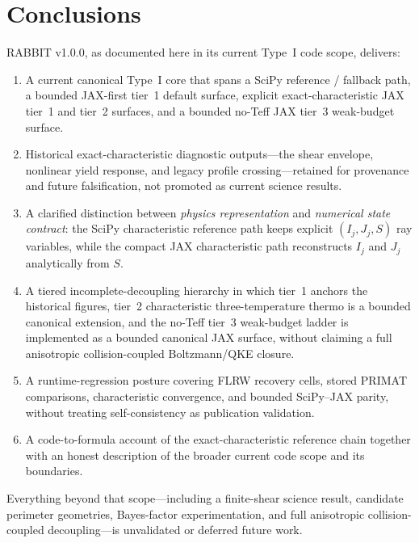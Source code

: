 \section{Conclusions}\label{sec:conclusions}

RABBIT v1.0.0, as documented here in its current Type~I code scope, delivers:

\begin{enumerate}
\item A current canonical Type~I core that spans a SciPy reference / fallback path, a bounded JAX-first tier~1 default surface, explicit exact-characteristic JAX tier~1 and tier~2 surfaces, and a bounded no-Teff JAX tier~3 weak-budget surface.

\item Historical exact-characteristic diagnostic outputs---the shear envelope, nonlinear yield response, and legacy profile crossing---retained for provenance and future falsification, not promoted as current science results.

\item A clarified distinction between \emph{physics representation} and \emph{numerical state contract}: the SciPy characteristic reference path keeps explicit $(I_j,J_j,S)$ ray variables, while the compact JAX characteristic path reconstructs $I_j$ and $J_j$ analytically from $S$.

\item A tiered incomplete-decoupling hierarchy in which tier~1 anchors the historical figures, tier~2 characteristic three-temperature thermo is a bounded canonical extension, and the no-Teff tier~3 weak-budget ladder is implemented as a bounded canonical JAX surface, without claiming a full anisotropic collision-coupled Boltzmann/QKE closure.

\item A runtime-regression posture covering FLRW recovery cells, stored PRIMAT comparisons, characteristic convergence, and bounded SciPy--JAX parity, without treating self-consistency as publication validation.

\item A code-to-formula account of the exact-characteristic reference chain together with an honest description of the broader current code scope and its boundaries.
\end{enumerate}

Everything beyond that scope---including a finite-shear science result, candidate perimeter geometries, Bayes-factor experimentation, and full anisotropic collision-coupled decoupling---is unvalidated or deferred future work.

